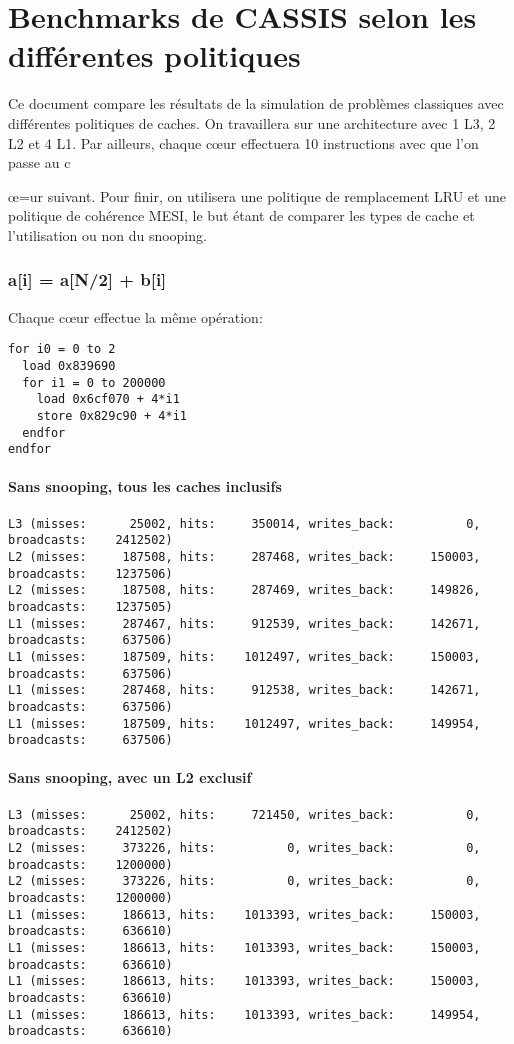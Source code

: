 \documentclass{article}
\begin{document}
\part*{Benchmarks de CASSIS selon les différentes politiques}
\indent Ce document compare les résultats de la simulation de problèmes classiques avec différentes politiques de caches. On travaillera sur une architecture avec 1 L3, 2 L2 et 4 L1. Par ailleurs, chaque c{\oe}ur effectuera 10 instructions avec que l'on passe au c{\oe=ur suivant. Pour finir, on utilisera une politique de remplacement LRU et une politique de cohérence MESI, le but étant de comparer les types de cache et l'utilisation ou non du snooping.

\section{a[i] = a[N/2] + b[i]}
\indent Chaque c{\oe}ur effectue la même opération:
\begin{verbatim}
for i0 = 0 to 2
  load 0x839690
  for i1 = 0 to 200000
    load 0x6cf070 + 4*i1
    store 0x829c90 + 4*i1
  endfor
endfor
\end{verbatim}

\subsection*{Sans snooping, tous les caches inclusifs}
\begin{verbatim}
L3 (misses:      25002, hits:     350014, writes_back:          0, broadcasts:    2412502)
L2 (misses:     187508, hits:     287468, writes_back:     150003, broadcasts:    1237506)
L2 (misses:     187508, hits:     287469, writes_back:     149826, broadcasts:    1237505)
L1 (misses:     287467, hits:     912539, writes_back:     142671, broadcasts:     637506)
L1 (misses:     187509, hits:    1012497, writes_back:     150003, broadcasts:     637506)
L1 (misses:     287468, hits:     912538, writes_back:     142671, broadcasts:     637506)
L1 (misses:     187509, hits:    1012497, writes_back:     149954, broadcasts:     637506)
\end{verbatim}

\subsection*{Sans snooping, avec un L2 exclusif}
\begin{verbatim}
L3 (misses:      25002, hits:     721450, writes_back:          0, broadcasts:    2412502)
L2 (misses:     373226, hits:          0, writes_back:          0, broadcasts:    1200000)
L2 (misses:     373226, hits:          0, writes_back:          0, broadcasts:    1200000)
L1 (misses:     186613, hits:    1013393, writes_back:     150003, broadcasts:     636610)
L1 (misses:     186613, hits:    1013393, writes_back:     150003, broadcasts:     636610)
L1 (misses:     186613, hits:    1013393, writes_back:     150003, broadcasts:     636610)
L1 (misses:     186613, hits:    1013393, writes_back:     149954, broadcasts:     636610)
\end{verbatim}

}
\end{document}
